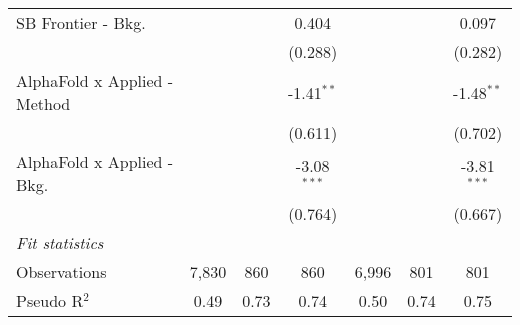 \begin{tabular}{lcccccc}
   SB Frontier - Bkg.           &                &               & 0.404         &                &               & 0.097\\   
                                &                &               & (0.288)       &                &               & (0.282)\\   
   AlphaFold x Applied - Method &                &               & -1.41$^{**}$  &                &               & -1.48$^{**}$\\   
                                &                &               & (0.611)       &                &               & (0.702)\\   
   AlphaFold x Applied - Bkg.   &                &               & -3.08$^{***}$ &                &               & -3.81$^{***}$\\   
                                &                &               & (0.764)       &                &               & (0.667)\\   
   \midrule
   \emph{Fit statistics}\\
   Observations                 & 7,830          & 860           & 860           & 6,996          & 801           & 801\\  
   Pseudo R$^2$                 & 0.49           & 0.73          & 0.74          & 0.50           & 0.74          & 0.75\\  
   

\end{tabular}
